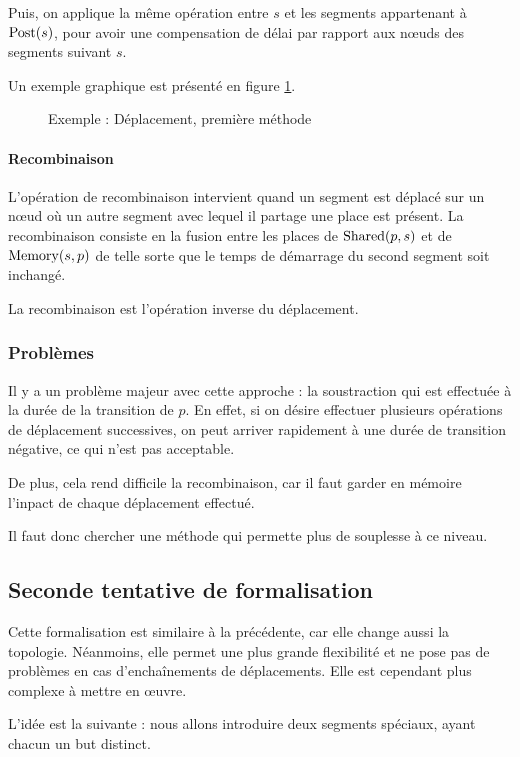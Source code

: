Puis, on applique la même opération entre $s$ et les segments appartenant à $\operatorname{Post}(s)$, pour avoir une compensation de délai par rapport aux nœuds des segments suivant $s$.

Un exemple graphique est présenté en figure \ref{fig:deplacementMethode1}.

\begin{figure}[h!]
\centering

\caption{Exemple : Déplacement, première méthode}
\label{fig:deplacementMethode1}
\end{figure}

\paragraph{Recombinaison}
L'opération de recombinaison intervient quand un segment est déplacé sur un nœud où un autre segment avec lequel il partage une place est présent.
La recombinaison consiste en la fusion entre les places de $\operatorname{Shared}(p, s)$ et de  $\operatorname{Memory}(s, p)$ de telle sorte que le temps de démarrage du second segment soit inchangé.

La recombinaison est l'opération inverse du déplacement.

\subsubsection{Problèmes}
Il y a un problème majeur avec cette approche : la soustraction qui est effectuée à la durée de la transition de $p$. En effet, si on désire effectuer plusieurs opérations de déplacement successives, on peut arriver rapidement à une durée de transition négative, ce qui n'est pas acceptable. 

De plus, cela rend difficile la recombinaison, car il faut garder en mémoire l'inpact de chaque déplacement effectué.

Il faut donc chercher une méthode qui permette plus de souplesse à ce niveau.

\subsection{Seconde tentative de formalisation}
Cette formalisation est similaire à la précédente, car elle change aussi la topologie. Néanmoins, elle permet une plus grande flexibilité et ne pose pas de problèmes en cas d'enchaînements de déplacements.
Elle est cependant plus complexe à mettre en œuvre.

L'idée est la suivante : nous allons introduire deux segments spéciaux, ayant chacun un but distinct.


